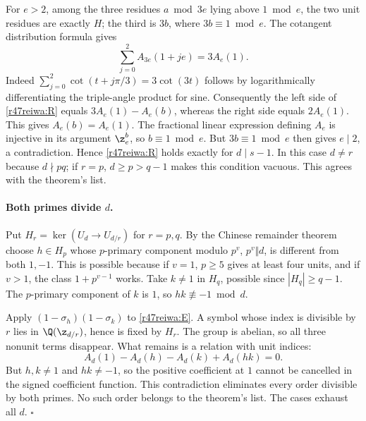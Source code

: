 \documentclass[11pt,a4paper]{article}
\numberwithin{equation}{section}
\theoremstyle{definition}
\theoremstyle{remark}
\begin{document}
For \(e>2\), among the three residues \(a\bmod 3e\) lying above \(1\bmod e\), the two unit residues are exactly \(H\); the third is \(3b\), where \(3b\equiv1\bmod e\). The cotangent distribution formula gives
\[
 \sum_{j=0}^{2}A_{3e}(1+je)=3A_e(1).
\]
Indeed \(\sum_{j=0}^2\cot(t+j\pi/3)=3\cot(3t)\) follows by logarithmically differentiating the triple-angle product for sine. Consequently the left side of \eqref{r47reiwa:R} equals \(3A_e(1)-A_e(b)\), whereas the right side equals \(2A_e(1)\). This gives \(A_e(b)=A_e(1)\). The fractional linear expression defining \(A_e\) is injective in its argument \(\z_e^b\), so \(b\equiv1\bmod e\). But \(3b\equiv1\bmod e\) then gives \(e\mid2\), a contradiction. Hence \eqref{r47reiwa:R} holds exactly for \(d\mid s-1\). In this case \(d\ne r\) because \(d\nmid pq\); if \(r=p\), \(d\ge p>q-1\) makes this condition vacuous. This agrees with the theorem's list.

\paragraph{Both primes divide \(d\).}
Put \(H_r=\ker(U_d\to U_{d/r})\) for \(r=p,q\). By the Chinese remainder theorem choose \(h\in H_p\) whose \(p\)-primary component modulo \(p^v\), \(p^v\Vert d\), is different from both \(1,-1\). This is possible because if \(v=1\), \(p\ge5\) gives at least four units, and if \(v>1\), the class \(1+p^{v-1}\) works. Take \(k\ne1\) in \(H_q\), possible since \(|H_q|\ge q-1\). The \(p\)-primary component of \(k\) is \(1\), so \(hk\not\equiv-1\bmod d\).

Apply \((1-\sigma_h)(1-\sigma_k)\) to \eqref{r47reiwa:E}. A symbol whose index is divisible by \(r\) lies in \(\Q(\z_{d/r})\), hence is fixed by \(H_r\). The group is abelian, so all three nonunit terms disappear. What remains is a relation with unit indices:
\[
 A_d(1)-A_d(h)-A_d(k)+A_d(hk)=0.
\]
But \(h,k\ne1\) and \(hk\ne-1\), so the positive coefficient at \(1\) cannot be cancelled in the signed coefficient function. This contradiction eliminates every order divisible by both primes. No such order belongs to the theorem's list. The cases exhaust all \(d\). \hfill\(\square\)
\end{document}
